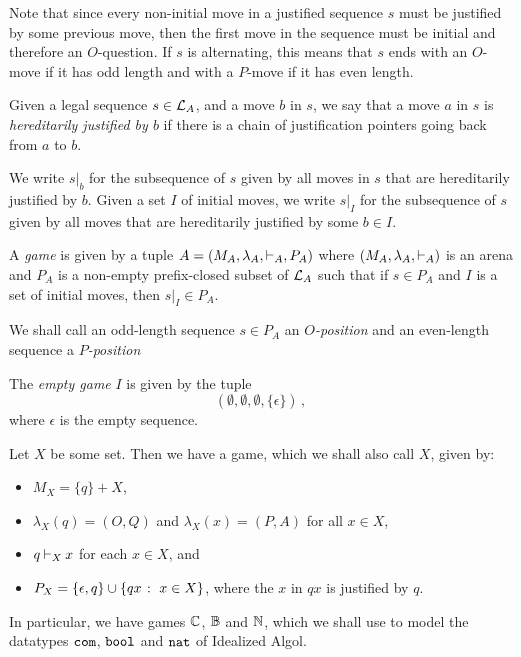\documentclass[11pt]{report}
\begin{document}
Note that since every non-initial move in a justified sequence $s$ must be justified by some previous move, then the first move in the sequence must be initial and therefore an $O$-question.  
If $s$ is alternating, this means that $s$ ends with an $O$-move if it has odd length and with a $P$-move if it has even length.  

\begin{definition}
  Given a legal sequence $s\in \mathcal L_A$, and a move $b$ in $s$, we say that a move $a$ in $s$ is \emph{hereditarily justified by $b$} if there is a chain of justification pointers going back from $a$ to $b$.

  We write $s\vert_b$ for the subsequence of $s$ given by all moves in $s$ that are hereditarily justified by $b$.
  Given a set $I$ of initial moves, we write $s\vert_I$ for the subsequence of $s$ given by all moves that are hereditarily justified by some $b\in I$.

  A \emph{game} is given by a tuple $A=(M_A,\lambda_A,\mathbin{\vdash}_A,P_A)$ where $(M_A,\lambda_A,\mathbin{\vdash}_A)$ is an arena and $P_A$ is a non-empty prefix-closed subset of $\mathcal L_A$ such that if $s\in P_A$ and $I$ is a set of initial moves, then $s\vert_I\in P_A$.
\end{definition}

We shall call an odd-length sequence $s\in P_A$ an \emph{$O$-position} and an even-length sequence a \emph{$P$-position}

\begin{example}
  The \emph{empty game} $I$ is given by the tuple
  \[
    (\emptyset,\emptyset,\emptyset,\{\epsilon\})\,,
    \]
  where $\epsilon$ is the empty sequence.
  \label{ExEmptyGame}
\end{example}

\begin{example}
  Let $X$ be some set.  
  Then we have a game, which we shall also call $X$, given by:
  \begin{itemize}
    \item $M_X = \{q\} + X$, 
    \item $\lambda_X(q)=(O,Q)$ and $\lambda_X(x)=(P,A)$ for all $x\in X$, 
    \item $q\mathbin{\vdash}_X x$ for each $x\in X$, and
    \item $P_X = \{\epsilon,q\}\cup\{qx\;\colon\; x\in X\}$, where the $x$ in $qx$ is justified by $q$.
  \end{itemize}

  In particular, we have games $\mathbb{C}$, $\mathbb{B}$ and $\mathbb{N}$, which we shall use to model the datatypes ${\mathtt{com}}$, ${\mathtt{bool}}$ and ${\mathtt{nat}}$ of Idealized Algol.
\end{example}
\end{document}

